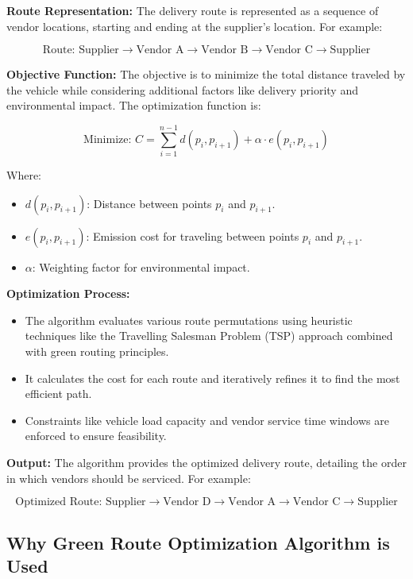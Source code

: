 \textbf{Route Representation:}  
The delivery route is represented as a sequence of vendor locations, starting and ending at the supplier's location. For example:

\[
\text{Route: Supplier} \rightarrow \text{Vendor A} \rightarrow \text{Vendor B} \rightarrow \text{Vendor C} \rightarrow \text{Supplier}
\]

\textbf{Objective Function:}  
The objective is to minimize the total distance traveled by the vehicle while considering additional factors like delivery priority and environmental impact. The optimization function is:

\[
\text{Minimize: } C = \sum_{i=1}^{n-1} d(p_i, p_{i+1}) + \alpha \cdot e(p_i, p_{i+1})
\]

Where:
\begin{itemize}
    \item \(d(p_i, p_{i+1})\): Distance between points \(p_i\) and \(p_{i+1}\).
    \item \(e(p_i, p_{i+1})\): Emission cost for traveling between points \(p_i\) and \(p_{i+1}\).
    \item \(\alpha\): Weighting factor for environmental impact.
\end{itemize}

\textbf{Optimization Process:}
\begin{itemize}
    \item The algorithm evaluates various route permutations using heuristic techniques like the Travelling Salesman Problem (TSP) approach combined with green routing principles.
    \item It calculates the cost for each route and iteratively refines it to find the most efficient path.
    \item Constraints like vehicle load capacity and vendor service time windows are enforced to ensure feasibility.
\end{itemize}

\textbf{Output:}  
The algorithm provides the optimized delivery route, detailing the order in which vendors should be serviced. For example:

\[
\text{Optimized Route: Supplier} \rightarrow \text{Vendor D} \rightarrow \text{Vendor A} \rightarrow \text{Vendor C} \rightarrow \text{Supplier}
\]

\subsection{Why Green Route Optimization Algorithm is Used}


